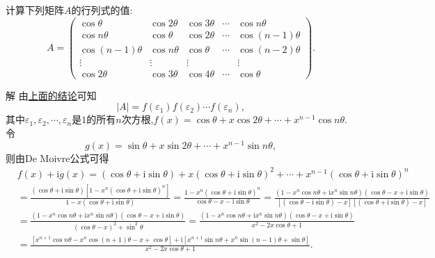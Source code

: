 \documentclass[../../main.tex]{subfiles}%
\begin{document}
\begin{example}
计算下列矩阵\(A\)的行列式的值:
\[
A = 
\begin{pmatrix}
\cos\theta & \cos2\theta & \cos3\theta & \cdots & \cos n\theta\\
\cos n\theta & \cos\theta & \cos2\theta & \cdots & \cos(n - 1)\theta\\
\cos(n - 1)\theta & \cos n\theta & \cos\theta & \cdots & \cos(n - 2)\theta\\
\vdots & \vdots & \vdots & & \vdots\\
\cos2\theta & \cos3\theta & \cos4\theta & \cdots & \cos\theta
\end{pmatrix}.
\]
\end{example}
\begin{solution}
解 由\hyperref[proposition:循环矩阵的特征值和对角化]{上面的结论}可知
\[
|A| = f(\varepsilon_1)f(\varepsilon_2)\cdots f(\varepsilon_n),
\]
其中\(\varepsilon_1,\varepsilon_2,\cdots,\varepsilon_n\)是\(1\)的所有\(n\)次方根,\(f(x)=\cos\theta + x\cos2\theta+\cdots+x^{n - 1}\cos n\theta\).令
\[
g(x)=\sin\theta + x\sin2\theta+\cdots+x^{n - 1}\sin n\theta,
\]
则由De Moivre公式可得
\begin{align*}
&f(x)+\mathrm{i}g(x)=\left( \cos \theta +\mathrm{i}\sin \theta \right) +x\left( \cos \theta +\mathrm{i}\sin \theta \right) ^2+\cdots +x^{n-1}\left( \cos \theta +\mathrm{i}\sin \theta \right) ^n
\\
&=\frac{\left( \cos \theta +\mathrm{i}\sin \theta \right) \left[ 1-x^n\left( \cos \theta +\mathrm{i}\sin \theta \right) ^n \right]}{1-x\left( \cos \theta +\mathrm{i}\sin \theta \right)}=\frac{1-x^n\left( \cos \theta +\mathrm{i}\sin \theta \right) ^n}{\cos \theta -x-\mathrm{i}\sin \theta}=\frac{\left( 1-x^n\cos n\theta +\mathrm{i}x^n\sin n\theta \right) \left( \cos \theta -x+\mathrm{i}\sin \theta \right)}{\left[ \left( \cos \theta -\mathrm{i}\sin \theta \right) -x \right] \left[ \left( \cos \theta +\mathrm{i}\sin \theta \right) -x \right]}
\\
&=\frac{\left( 1-x^n\cos n\theta +\mathrm{i}x^n\sin n\theta \right) \left( \cos \theta -x+\mathrm{i}\sin \theta \right)}{\left( \cos \theta -x \right) ^2+\sin ^2\theta}=\frac{\left( 1-x^n\cos n\theta +\mathrm{i}x^n\sin n\theta \right) \left( \cos \theta -x+\mathrm{i}\sin \theta \right)}{x^2-2x\cos \theta +1}
\\
&=\frac{\left[ x^{n+1}\cos n\theta -x^n\cos \left( n+1 \right) \theta -x+\cos \theta \right] +\mathrm{i}\left[ x^{n+1}\sin n\theta +x^n\sin \left( n-1 \right) \theta +\sin \theta \right]}{x^2-2x\cos \theta +1}.

\end{align*}
\end{solution}
\end{document}
